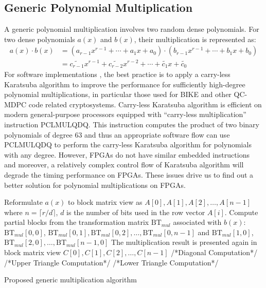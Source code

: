 \documentclass[runningheads]{llncs}
\begin{document}
\subsection{Generic Polynomial Multiplication}
\label{sub::dense}
A generic polynomial multiplication involves two random dense polynomials.
For two dense polynomials $a(x)$ and $b(x)$, their multiplication is represented as:
\begin{align}
    a(x)\cdot b(x) &= (a_{r-1}x^{r-1}+\cdots + a_{1}x + a_0)\cdot(b_{r-1}x^{r-1}+\cdots + b_{1}x + b_0)\\
    &= \widetilde{c_{r-1}}x^{r-1}+\widetilde{c_{r-2}}x^{r-2}+\cdots + \widetilde{c_{1}}x +\widetilde{c_0}
\end{align}
%
For software implementations \cite{chou2016qcbits,drucker2017toolbox}, the best practice is to apply a carry-less Karatsuba algorithm to improve the performance for sufficiently high-degree polynomial multiplications, in particular those used for BIKE and other QC-MDPC code related cryptosystems. Carry-less Karatsuba algorithm is efficient on modern general-purpose processors equipped with ``carry-less multiplication'' instruction  PCLMULQDQ. This instruction computes the product of two binary polynomials of degree 63 and thus an appropriate software flow can use PCLMULQDQ to perform the carry-less Karatsuba algorithm for polynomials with any degree. However, FPGAs do not have
similar embedded instructions and moreover, a relatively complex control flow of Karatsuba algorithm will degrade the timing performance on FPGAs.
These issues drive us to find out a better solution for polynomial multiplications on FPGAs.


\begin{algorithm}[!tbh]
 \DontPrintSemicolon %
    Reformulate $a(x)$ to block matrix view as $A[0],A[1],A[2],\ldots, A[n-1]$ where $n=\lceil r/d \rceil$, $d$ is the number of bits used in the row vector $A[i]$.\;
    Compute partial blocks from the transformation matrix $\text{BT}_{mul}$ associated with $b(x)$: $\text{BT}_{mul}[0,0]$, $\text{BT}_{mul}[0,1],\text{BT}_{mul}[0,2],\ldots,\text{BT}_{mul}[0,n-1]$ and $\text{BT}_{mul}[1,0]$, $\text{BT}_{mul}[2,0],\ldots,\text{BT}_{mul}[n-1,0]$\;
    The multiplication result is presented again in block matrix view $C[0],C[1],C[2],\ldots, C[n-1]$\;
    /*Diagonal Computation*/\;
    /*Upper Triangle Computation*/\;
    /*Lower Triangle Computation*/\;
 \caption{Proposed generic multiplication algorithm}\label{alg:generic_mul}
\end{algorithm}
\end{document}
